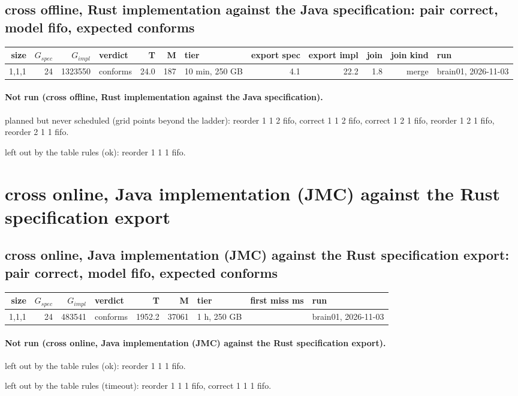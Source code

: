 \documentclass[10pt]{article}
\begin{document}
\subsection*{cross offline, Rust implementation against the Java specification: pair \textsf{correct}, model fifo, expected conforms}
\begin{longtable}{@{}rrrlrrlrrrrl@{}}
\toprule
size & $G_{\mathit{spec}}$ & $G_{\mathit{impl}}$ & verdict & T & M & tier & export spec & export impl & join & join kind & run \\
\midrule
\endhead
\color{blue} 1,1,1 & 24 & 1323550 & conforms & 24.0 & 187 & 10 min, 250 GB & 4.1 & 22.2 & 1.8 & merge & brain01, 2026-11-03 \\
\bottomrule
\end{longtable}
\paragraph{Not run (cross offline, Rust implementation against the Java specification).}
planned but never scheduled (grid points beyond the ladder): reorder 1 1 2 fifo, correct 1 1 2 fifo, correct 1 2 1 fifo, reorder 1 2 1 fifo, reorder 2 1 1 fifo.\par
left out by the table rules (ok): reorder 1 1 1 fifo.\par
\section*{cross online, Java implementation (JMC) against the Rust specification export}
\subsection*{cross online, Java implementation (JMC) against the Rust specification export: pair \textsf{correct}, model fifo, expected conforms}
\begin{longtable}{@{}rrrlrrlrl@{}}
\toprule
size & $G_{\mathit{spec}}$ & $G_{\mathit{impl}}$ & verdict & T & M & tier & first miss ms & run \\
\midrule
\endhead
\color{blue} 1,1,1 & 24 & 483541 & conforms & 1952.2 & 37061 & 1 h, 250 GB &  & brain01, 2026-11-03 \\
\bottomrule
\end{longtable}
\paragraph{Not run (cross online, Java implementation (JMC) against the Rust specification export).}
left out by the table rules (ok): reorder 1 1 1 fifo.\par
left out by the table rules (timeout): reorder 1 1 1 fifo, correct 1 1 1 fifo.\par
\end{document}
